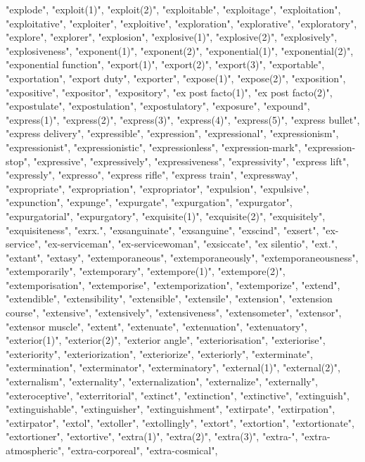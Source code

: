"explode",
"exploit(1)",
"exploit(2)",
"exploitable",
"exploitage",
"exploitation",
"exploitative",
"exploiter",
"exploitive",
"exploration",
"explorative",
"exploratory",
"explore",
"explorer",
"explosion",
"explosive(1)",
"explosive(2)",
"explosively",
"explosiveness",
"exponent(1)",
"exponent(2)",
"exponential(1)",
"exponential(2)",
"exponential function",
"export(1)",
"export(2)",
"export(3)",
"exportable",
"exportation",
"export duty",
"exporter",
"expose(1)",
"expose(2)",
"exposition",
"expositive",
"expositor",
"expository",
"ex post facto(1)",
"ex post facto(2)",
"expostulate",
"expostulation",
"expostulatory",
"exposure",
"expound",
"express(1)",
"express(2)",
"express(3)",
"express(4)",
"express(5)",
"express bullet",
"express delivery",
"expressible",
"expression",
"expressional",
"expressionism",
"expressionist",
"expressionistic",
"expressionless",
"expression-mark",
"expression-stop",
"expressive",
"expressively",
"expressiveness",
"expressivity",
"express lift",
"expressly",
"expresso",
"express rifle",
"express train",
"expressway",
"expropriate",
"expropriation",
"expropriator",
"expulsion",
"expulsive",
"expunction",
"expunge",
"expurgate",
"expurgation",
"expurgator",
"expurgatorial",
"expurgatory",
"exquisite(1)",
"exquisite(2)",
"exquisitely",
"exquisiteness",
"exrx.",
"exsanguinate",
"exsanguine",
"exscind",
"exsert",
"ex-service",
"ex-serviceman",
"ex-servicewoman",
"exsiccate",
"ex silentio",
"ext.",
"extant",
"extasy",
"extemporaneous",
"extemporaneously",
"extemporaneousness",
"extemporarily",
"extemporary",
"extempore(1)",
"extempore(2)",
"extemporisation",
"extemporise",
"extemporization",
"extemporize",
"extend",
"extendible",
"extensibility",
"extensible",
"extensile",
"extension",
"extension course",
"extensive",
"extensively",
"extensiveness",
"extensometer",
"extensor",
"extensor muscle",
"extent",
"extenuate",
"extenuation",
"extenuatory",
"exterior(1)",
"exterior(2)",
"exterior angle",
"exteriorisation",
"exteriorise",
"exteriority",
"exteriorization",
"exteriorize",
"exteriorly",
"exterminate",
"extermination",
"exterminator",
"exterminatory",
"external(1)",
"external(2)",
"externalism",
"externality",
"externalization",
"externalize",
"externally",
"exteroceptive",
"exterritorial",
"extinct",
"extinction",
"extinctive",
"extinguish",
"extinguishable",
"extinguisher",
"extinguishment",
"extirpate",
"extirpation",
"extirpator",
"extol",
"extoller",
"extollingly",
"extort",
"extortion",
"extortionate",
"extortioner",
"extortive",
"extra(1)",
"extra(2)",
"extra(3)",
"extra-",
"extra-atmospheric",
"extra-corporeal",
"extra-cosmical",
